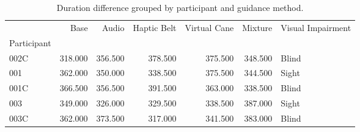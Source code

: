 
\begin{table}[!htb]
\centering
\caption{Duration difference grouped by participant and guidance method.}
\label{tab:duracao_average}
\begin{tabular}{lrrrrrl}
\toprule
{} &    Base &   Audio &  Haptic Belt &  Virtual Cane &  Mixture & Visual Impairment \\
Participant &         &         &              &               &          &                   \\
\midrule
002C        & 318.000 & 356.500 &      378.500 &       375.500 &  348.500 &             Blind \\
001         & 362.000 & 350.000 &      338.500 &       375.500 &  344.500 &             Sight \\
001C        & 366.500 & 356.500 &      391.500 &       363.000 &  338.500 &             Blind \\
003         & 349.000 & 326.000 &      329.500 &       338.500 &  387.000 &             Sight \\
003C        & 362.000 & 373.500 &      317.000 &       341.500 &  383.000 &             Blind \\
\bottomrule
\end{tabular}
\end{table}

